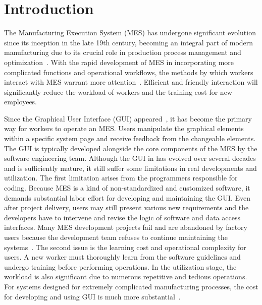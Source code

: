 \documentclass[preprint,12pt]{elsarticle}
\begin{document}

\section{Introduction}

The Manufacturing Execution System (MES) has undergone significant evolution since its inception in the late 19th century, becoming an integral part of modern manufacturing due to its crucial role in production process management and optimization~\cite{doi:10.1080/09537280902938613}. 
With the rapid development of MES in incorporating more complicated functions and operational workflows, the methods by which workers interact with MES warrant more attention~\cite{9781176}. 
Efficient and friendly interaction will significantly reduce the workload of workers and the training cost for new employees.


Since the Graphical User Interface (GUI) appeared~\cite {martinez2011graphical}, 
it has become the primary way for workers to operate an MES.
Users manipulate the graphical elements within a specific system page and receive feedback from the changeable elements.
The GUI is typically developed alongside the core components of the MES by the software engineering team.
Although the GUI in has evolved over several decades and is sufficiently mature, it still suffer some limitations in real developments and utilization.
The first limitation arises from the programmers responsible for coding.
Because MES is a kind of non-standardized and customized software, it demands substantial labor effort for developing and maintaining the GUI.
Even after project delivery, users may still present various new requirements and the developers have to intervene and revise the logic of software and data access interfaces.
Many MES development projects fail and are abandoned by factory users because the development team refuses to continue maintaining the systems~\cite{pr10112173}.
The second issue is the learning cost and operational complexity for users.
A new worker must thoroughly learn from the software guidelines and undergo training before performing operations.
In the utilization stage, the workload is also significant due to numerous repetitive and tedious operations.
For systems designed for extremely complicated manufacturing processes, the cost for developing and using GUI is much more substantial~\cite{li2022application}.
\end{document}
